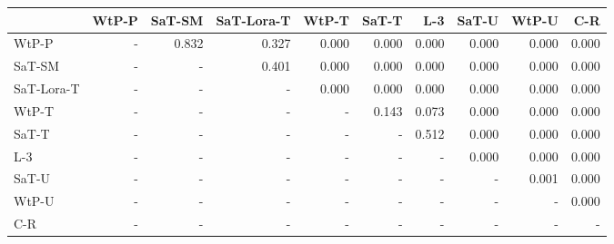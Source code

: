 \begin{tabular}{lrrrrrrrrr}
\toprule
 & WtP-P & SaT-SM & SaT-Lora-T & WtP-T & SaT-T & L-3 & SaT-U & WtP-U & C-R \\
\midrule
WtP-P & - & 0.832 & 0.327 & 0.000 & 0.000 & 0.000 & 0.000 & 0.000 & 0.000 \\
SaT-SM & - & - & 0.401 & 0.000 & 0.000 & 0.000 & 0.000 & 0.000 & 0.000 \\
SaT-Lora-T & - & - & - & 0.000 & 0.000 & 0.000 & 0.000 & 0.000 & 0.000 \\
WtP-T & - & - & - & - & 0.143 & 0.073 & 0.000 & 0.000 & 0.000 \\
SaT-T & - & - & - & - & - & 0.512 & 0.000 & 0.000 & 0.000 \\
L-3 & - & - & - & - & - & - & 0.000 & 0.000 & 0.000 \\
SaT-U & - & - & - & - & - & - & - & 0.001 & 0.000 \\
WtP-U & - & - & - & - & - & - & - & - & 0.000 \\
C-R & - & - & - & - & - & - & - & - & - \\
\bottomrule
\end{tabular}


